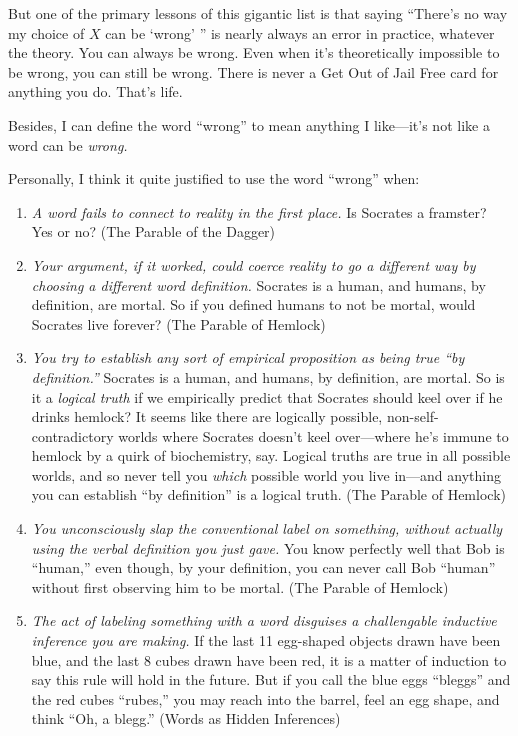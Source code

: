 {
 But one of the primary lessons of this gigantic list is that
saying ``There's no way my choice of $X$
can be `wrong' '' is
nearly always an error in practice, whatever the theory. You can always
be wrong. Even when it's theoretically impossible to be
wrong, you can still be wrong. There is never a Get Out of Jail Free
card for anything you do. That's life.}

{
 Besides, I can define the word
``wrong'' to mean anything I
like---it's not like a word can be \textit{wrong.}}

{
 Personally, I think it quite justified to use the word
``wrong'' when:}

\begin{enumerate}
\item {
 \textit{A word fails to connect to reality in the first place.} Is
Socrates a framster? Yes or no? (The Parable of the Dagger)}

\item {
 \textit{Your argument, if it worked, could coerce reality to go a
different way by choosing a different word definition.} Socrates is a
human, and humans, by definition, are mortal. So if you defined humans
to not be mortal, would Socrates live forever? (The Parable of
Hemlock)}

\item {
 \textit{You try to establish any sort of empirical proposition as
being true ``by definition.''}
Socrates is a human, and humans, by definition, are mortal. So is it a
\textit{logical truth} if we empirically predict that Socrates should
keel over if he drinks hemlock? It seems like there are logically
possible, non-self-contradictory worlds where Socrates
doesn't keel over---where he's immune
to hemlock by a quirk of biochemistry, say. Logical truths are true in
all possible worlds, and so never tell you \textit{which} possible
world you live in---and anything you can establish
``by definition'' is a logical
truth. (The Parable of Hemlock)}

\item {
 \textit{You unconsciously slap the conventional label on
something, without actually using the verbal definition you just gave.}
You know perfectly well that Bob is
``human,'' even though, by your
definition, you can never call Bob
``human'' without first observing
him to be mortal. (The Parable of Hemlock)}

\item {
 \textit{The act of labeling something with a word disguises a
challengable inductive inference you are making.} If the last 11
egg-shaped objects drawn have been blue, and the last 8 cubes drawn
have been red, it is a matter of induction to say this rule will hold
in the future. But if you call the blue eggs
``bleggs'' and the red cubes
``rubes,'' you may reach into the
barrel, feel an egg shape, and think ``Oh, a
blegg.'' (Words as Hidden Inferences)}


\end{enumerate}
